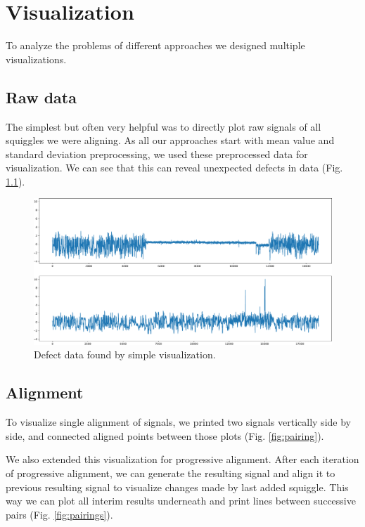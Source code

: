 \chapter{Visualization}

\label{kap:visualization} %

To analyze the problems of different approaches we designed multiple visualizations.

\section{Raw data}

The simplest but often very helpful was to directly plot raw signals of all squiggles we were aligning. As all our approaches start with mean value and standard deviation preprocessing, 
we used these preprocessed data for visualization. We can see that this can reveal unexpected defects in data (Fig. \ref{fig:signals}). 

\begin{figure}[h]
  \centering
  \includegraphics[width=1.0\textwidth]{images/signals}
  \caption{Defect data found by simple visualization.}
  \label{fig:signals}
\end{figure}

\section{Alignment}
To visualize single alignment of signals, we printed two signals vertically side by side, and connected
aligned points between those plots (Fig. \ref{fig:pairing}). 

We also extended this visualization for progressive alignment. 
After each iteration of progressive alignment, we can generate the resulting signal and align it to previous resulting signal to visualize
changes made by last added squiggle. This way we can plot all interim results underneath and print lines between successive pairs (Fig. \ref{fig:pairings}).


